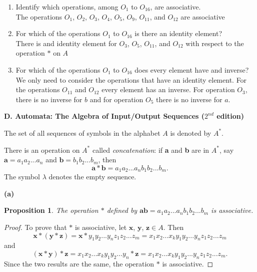 \documentclass[12pt]{article}
\newtheorem*{proposition}{Proposition}  %
\begin{document}
\begin{enumerate}
    \item Identify which operations, among $O_1$ to $O_{16}$, are associative. \\
    \smallskip
      The operations $O_1$, $O_2$, $O_3$, $O_4$, $O_5$, $O_9$, $O_{11}$, and $O_{12}$ are associative
    \item For which of the operations $O_1$ to $O_{16}$ is there an identity element? \\
    \smallskip
      There is and identity element for $O_3$, $O_5$, $O_{11}$, and $O_{12}$ with respect to the operation $*$ on $A$
    \item For which of the operations $O_1$ to $O_{16}$ does every element have and inverse? \\
    \smallskip
      We only need to consider the operations that have an identity element. For the operations $O_{11}$ and $O_{12}$ every element has an inverse. For operation $O_3$, there is no inverse for $b$ and for operation $O_5$ there is no inverse for $a$.
  \end{enumerate}


\noindent\textbf{D. Automata: The Algebra of Input/Output Sequences ($2^{nd}$ edition)} \smallskip

\noindent The set of all sequences of symbols in the alphabet $A$ is denoted by $A^*$.

There is an operation on $A^*$ called \textit{concatenation}: if \textbf{a} and \textbf{b} are in $A^*$, say $\textbf{a} = a_1a_2...a_n$ and $\textbf{b} = b_1b_2...b_m$, then
  \begin{equation*}
    \textbf{a}*\textbf{b} = a_1a_2...a_nb_1b_2...b_m.
  \end{equation*}
The symbol $\lambda$ denotes the empty sequence.

\bigskip

\noindent\textbf{(a)}
\begin{proposition}
  The operation $*$ defined by $\textbf{ab} = a_1a_2...a_nb_1b_2...b_m$ is associative.
\end{proposition}
\begin{proof}
To prove that $*$ is associative, let $\textbf{x}$, $\textbf{y}$, $\textbf{z} \in A$. Then
\begin{equation*}
  \textbf{x} * (\textbf{y} * \textbf{z}) = \textbf{x} * y_1y_2...y_n z_1z_2...z_m = x_1x_2...x_k y_1y_2...y_n z_1z_2...z_m 
\end{equation*}
and
\begin{equation*}
  (\textbf{x} * \textbf{y}) * \textbf{z} = x_1x_2...x_k y_1y_2...y_n * \textbf{z} = x_1x_2...x_k y_1y_2...y_n z_1z_2...z_m.
\end{equation*}
Since the two results are the same, the operation $*$ is associative.
\end{proof}
\end{document}
